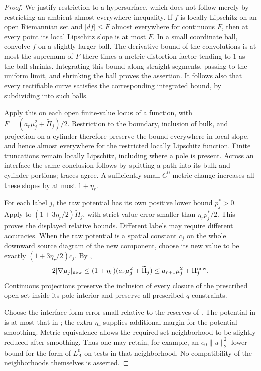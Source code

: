 \begin{proof}
We justify restriction to a hypersurface, which does not follow merely
by restricting an ambient almost-everywhere inequality.  If $f$ is
locally Lipschitz on an open Riemannian set and $|df|\le F$ almost
everywhere for continuous $F$, then at every point its local Lipschitz
slope is at most $F$.  In a small coordinate ball, convolve $f$ on a
slightly larger ball.  The derivative bound of the convolutions is at
most the supremum of $F$ there times a metric distortion factor tending
to $1$ as the ball shrinks.  Integrating this bound along straight
segments, passing to the uniform limit, and shrinking the ball proves
the assertion.  It follows also that every rectifiable curve satisfies
the corresponding integrated bound, by subdividing into such balls.

Apply this on each open finite-value locus of a function, with
$F=(a_r\mu_j^2+\widetilde\Pi_j)/2$.  Restriction to the boundary,
inclusion of bulk, and projection on a cylinder therefore preserve the
bound everywhere in local slope, and hence almost everywhere for the
restricted locally Lipschitz function.  Finite truncations remain
locally Lipschitz, including where a pole is present.  Across an interface
the same conclusion follows by splitting a path into its bulk and
cylinder portions; traces agree.  A sufficiently small $C^0$ metric
change increases all these slopes by at most $1+\eta_r$.

For each label $j$, the raw potential has its own positive lower
bound $p_j^*>0$.  Apply  to
$(1+3\eta_r/2)\widetilde\Pi_j$, with strict value error smaller than
$\eta_r p_j^*/2$.  This proves the displayed relative bounds.  Different
labels may require different accuracies.  When the raw potential is
a spatial constant $c_j$ on the whole downward source diagram of the
new component, choose its new value to be exactly $(1+3\eta_r/2)c_j$.  By
,
\[
 2|\nabla\mu_j|_{\rm new}
 \le (1+\eta_r)(a_r\mu_j^2+\widetilde\Pi_j)
 \le a_{r+1}\mu_j^2+\Pi_j^{\rm new}.
\]
Continuous projections preserve the inclusion of every closure of the prescribed open set
inside its pole interior and preserve all prescribed $q$ constraints.

Choose the interface form error small relative to the reserves of
.  The potential in  is at
most that in ; the extra $\eta_r$ supplies
additional margin for the potential smoothing.  Metric equivalence
allows the required-set neighborhood to be slightly reduced after
smoothing.  Thus one may retain, for example, an $e_0\|u\|_2^2$
lower bound for the form of $L_A^0$ on tests in that neighborhood.
No compatibility of the neighborhoods themselves is asserted.
\end{proof}

